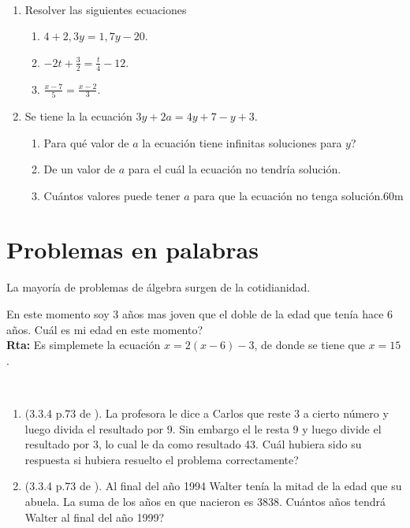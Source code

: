 \begin{exers}{\ \\}
\begin{enumerate}
\item Resolver las siguientes ecuaciones
		\begin{enumerate}[label=\Alph*)]
		\item $4+2,3y=1,7y-20$.
		\item $-2t+\frac{3}{2} = \frac{t}{4}-12$.
		\item $\frac{x-7}{5}=\frac{x-2}{3}$.
		\end{enumerate}
	
\item Se tiene la la ecuación $3y+2a=4y+7-y+3$.
		\begin{enumerate}[label=\Alph*)]
			\item Para qué valor de $a$ la ecuación tiene infinitas soluciones para $y$?
			\item De un valor de $a$ para el cuál la ecuación no tendría solución.
			\item Cuántos valores puede tener $a$ para que la ecuación no tenga solución.60m
		\end{enumerate}

\end{enumerate}
\end{exers}

\section{Problemas en palabras}\label{seccion_problemas_en_palabras}
La mayoría de problemas de álgebra surgen de la cotidianidad.

\begin{ejemplo}
En este momento soy 3 años mas joven que el doble de la edad que tenía hace 6 años. Cuál es mi edad en este momento?\\
\textbf{Rta: } Es simplemete la ecuación $x=2(x-6)-3$,  de donde se tiene que $x=15$.
\end{ejemplo}

\begin{exers}{\ \\}
\begin{enumerate}
\item (3.3.4 p.73 de \cite{Aops_algebra}). La profesora le dice a Carlos que reste 3 a cierto número y luego divida el resultado por 9. Sin embargo el le resta 9 y luego divide el resultado por 3, lo cual le da como resultado 43. Cuál hubiera sido su respuesta si hubiera resuelto el problema correctamente?

\item (3.3.4 p.73 de \cite{Aops_algebra}). Al final del año 1994 Walter tenía la mitad de la edad que su abuela. La suma de los años en que nacieron es 3838. Cuántos años tendrá Walter al final del año 1999?
\end{enumerate}
\end{exers}


